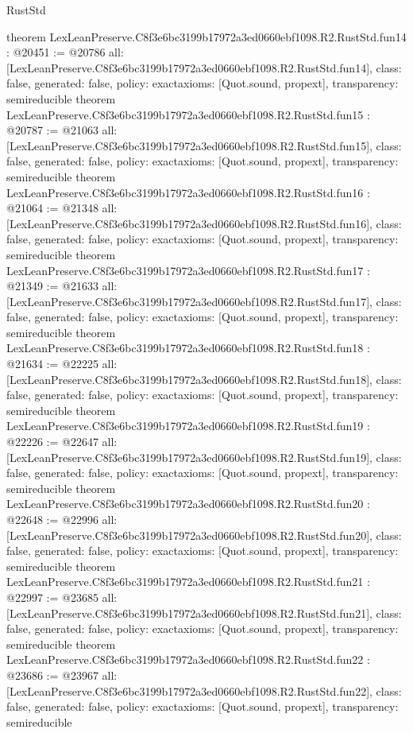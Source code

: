 \begin{lexlean}{RustStd}
\begin{coremodule}
{}
theorem LexLeanPreserve.C8f3e6bc3199b17972a3ed0660ebf1098.R2.RustStd.fun14 : @20451 := @20786 {
  all: [LexLeanPreserve.C8f3e6bc3199b17972a3ed0660ebf1098.R2.RustStd.fun14],
  class: false,
  generated: false,
  policy: exact{axioms: [Quot.sound, propext]},
  transparency: semireducible
}
theorem LexLeanPreserve.C8f3e6bc3199b17972a3ed0660ebf1098.R2.RustStd.fun15 : @20787 := @21063 {
  all: [LexLeanPreserve.C8f3e6bc3199b17972a3ed0660ebf1098.R2.RustStd.fun15],
  class: false,
  generated: false,
  policy: exact{axioms: [Quot.sound, propext]},
  transparency: semireducible
}
theorem LexLeanPreserve.C8f3e6bc3199b17972a3ed0660ebf1098.R2.RustStd.fun16 : @21064 := @21348 {
  all: [LexLeanPreserve.C8f3e6bc3199b17972a3ed0660ebf1098.R2.RustStd.fun16],
  class: false,
  generated: false,
  policy: exact{axioms: [Quot.sound, propext]},
  transparency: semireducible
}
theorem LexLeanPreserve.C8f3e6bc3199b17972a3ed0660ebf1098.R2.RustStd.fun17 : @21349 := @21633 {
  all: [LexLeanPreserve.C8f3e6bc3199b17972a3ed0660ebf1098.R2.RustStd.fun17],
  class: false,
  generated: false,
  policy: exact{axioms: [Quot.sound, propext]},
  transparency: semireducible
}
theorem LexLeanPreserve.C8f3e6bc3199b17972a3ed0660ebf1098.R2.RustStd.fun18 : @21634 := @22225 {
  all: [LexLeanPreserve.C8f3e6bc3199b17972a3ed0660ebf1098.R2.RustStd.fun18],
  class: false,
  generated: false,
  policy: exact{axioms: [Quot.sound, propext]},
  transparency: semireducible
}
theorem LexLeanPreserve.C8f3e6bc3199b17972a3ed0660ebf1098.R2.RustStd.fun19 : @22226 := @22647 {
  all: [LexLeanPreserve.C8f3e6bc3199b17972a3ed0660ebf1098.R2.RustStd.fun19],
  class: false,
  generated: false,
  policy: exact{axioms: [Quot.sound, propext]},
  transparency: semireducible
}
theorem LexLeanPreserve.C8f3e6bc3199b17972a3ed0660ebf1098.R2.RustStd.fun20 : @22648 := @22996 {
  all: [LexLeanPreserve.C8f3e6bc3199b17972a3ed0660ebf1098.R2.RustStd.fun20],
  class: false,
  generated: false,
  policy: exact{axioms: [Quot.sound, propext]},
  transparency: semireducible
}
theorem LexLeanPreserve.C8f3e6bc3199b17972a3ed0660ebf1098.R2.RustStd.fun21 : @22997 := @23685 {
  all: [LexLeanPreserve.C8f3e6bc3199b17972a3ed0660ebf1098.R2.RustStd.fun21],
  class: false,
  generated: false,
  policy: exact{axioms: [Quot.sound, propext]},
  transparency: semireducible
}
theorem LexLeanPreserve.C8f3e6bc3199b17972a3ed0660ebf1098.R2.RustStd.fun22 : @23686 := @23967 {
  all: [LexLeanPreserve.C8f3e6bc3199b17972a3ed0660ebf1098.R2.RustStd.fun22],
  class: false,
  generated: false,
  policy: exact{axioms: [Quot.sound, propext]},
  transparency: semireducible
}
\end{coremodule}
\end{lexlean}
